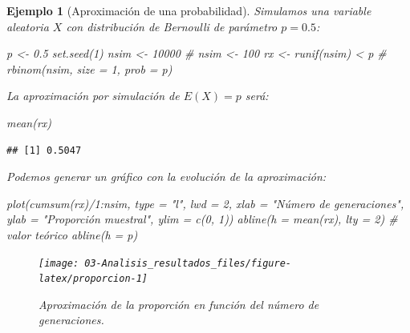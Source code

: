 \documentclass[
]{book}
\newenvironment{Shaded}{\begin{snugshade}}{\end{snugshade}}
\newcommand{\AttributeTok}[1]{\textcolor[rgb]{0.77,0.63,0.00}{#1}}
\newcommand{\CommentTok}[1]{\textcolor[rgb]{0.56,0.35,0.01}{\textit{#1}}}
\newcommand{\DecValTok}[1]{\textcolor[rgb]{0.00,0.00,0.81}{#1}}
\newcommand{\FloatTok}[1]{\textcolor[rgb]{0.00,0.00,0.81}{#1}}
\newcommand{\FunctionTok}[1]{\textcolor[rgb]{0.00,0.00,0.00}{#1}}
\newcommand{\NormalTok}[1]{#1}
\newcommand{\OtherTok}[1]{\textcolor[rgb]{0.56,0.35,0.01}{#1}}
\newcommand{\SpecialCharTok}[1]{\textcolor[rgb]{0.00,0.00,0.00}{#1}}
\newcommand{\StringTok}[1]{\textcolor[rgb]{0.31,0.60,0.02}{#1}}
\theoremstyle{break}
\newtheorem{example}{Ejemplo}[chapter]
\theoremstyle{nonumberplain}
\begin{document}
\begin{example}[Aproximación de una probabilidad]

Simulamos una variable aleatoria \(X\) con distribución de Bernoulli de parámetro \(p=0.5\):

\begin{Shaded}
\begin{Highlighting}[]
\NormalTok{p }\OtherTok{\textless{}{-}} \FloatTok{0.5}
\FunctionTok{set.seed}\NormalTok{(}\DecValTok{1}\NormalTok{)}
\NormalTok{nsim }\OtherTok{\textless{}{-}} \DecValTok{10000} \CommentTok{\# nsim \textless{}{-} 100}
\NormalTok{rx }\OtherTok{\textless{}{-}} \FunctionTok{runif}\NormalTok{(nsim) }\SpecialCharTok{\textless{}}\NormalTok{ p }\CommentTok{\# rbinom(nsim, size = 1, prob = p)}
\end{Highlighting}
\end{Shaded}

La aproximación por simulación de \(E(X) = p\) será:

\begin{Shaded}
\begin{Highlighting}[]
\FunctionTok{mean}\NormalTok{(rx) }
\end{Highlighting}
\end{Shaded}

\begin{verbatim}
## [1] 0.5047
\end{verbatim}

Podemos generar un gráfico con la evolución de la aproximación:

\begin{Shaded}
\begin{Highlighting}[]
\FunctionTok{plot}\NormalTok{(}\FunctionTok{cumsum}\NormalTok{(rx)}\SpecialCharTok{/}\DecValTok{1}\SpecialCharTok{:}\NormalTok{nsim, }\AttributeTok{type =} \StringTok{"l"}\NormalTok{, }\AttributeTok{lwd =} \DecValTok{2}\NormalTok{, }\AttributeTok{xlab =} \StringTok{"Número de generaciones"}\NormalTok{, }
     \AttributeTok{ylab =} \StringTok{"Proporción muestral"}\NormalTok{, }\AttributeTok{ylim =} \FunctionTok{c}\NormalTok{(}\DecValTok{0}\NormalTok{, }\DecValTok{1}\NormalTok{))}
\FunctionTok{abline}\NormalTok{(}\AttributeTok{h =} \FunctionTok{mean}\NormalTok{(rx), }\AttributeTok{lty =} \DecValTok{2}\NormalTok{)}
\CommentTok{\# valor teórico}
\FunctionTok{abline}\NormalTok{(}\AttributeTok{h =}\NormalTok{ p) }
\end{Highlighting}
\end{Shaded}

\begin{figure}[!htb]

{\centering \texttt{[image: 03-Analisis\_resultados\_files/figure-latex/proporcion-1]} 

}

\caption{Aproximación de la proporción en función del número de generaciones.}\label{fig:proporcion}
\end{figure}

\end{example}
\end{document}
